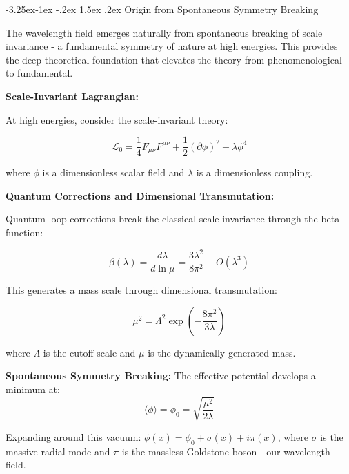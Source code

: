 \documentclass[10pt,twocolumn]{article}
\makeatletter
\renewcommand\subsection{\@startsection{subsection}{2}{\z@}%
  {-3.25ex\@plus -1ex \@minus -.2ex}%
  {1.5ex \@plus .2ex}%
  {\normalfont\normalsize\bfseries}}
\makeatother
\begin{document}
\subsection{Origin from Spontaneous Symmetry Breaking}

The wavelength field emerges naturally from spontaneous breaking of scale invariance - a fundamental symmetry of nature at high energies. This provides the deep theoretical foundation that elevates the theory from phenomenological to fundamental.

\textbf{Scale-Invariant Lagrangian:}

At high energies, consider the scale-invariant theory:

\begin{equation}
\mathcal{L}_0 = \frac{1}{4}F_{\mu\nu}F^{\mu\nu} + \frac{1}{2}(\partial\phi)^2 - \lambda\phi^4
\label{eq:scale_invariant}
\end{equation}

where $\phi$ is a dimensionless scalar field and $\lambda$ is a dimensionless coupling.

\vspace{0.3em}
\textbf{Quantum Corrections and Dimensional Transmutation:}

Quantum loop corrections break the classical scale invariance through the beta function:

\begin{equation}
\beta(\lambda) = \frac{d\lambda}{d\ln\mu} = \frac{3\lambda^2}{8\pi^2} + O(\lambda^3)
\end{equation}

This generates a mass scale through dimensional transmutation:

\begin{equation}
\mu^2 = \Lambda^2 \exp\left(-\frac{8\pi^2}{3\lambda}\right)
\end{equation}

where $\Lambda$ is the cutoff scale and $\mu$ is the dynamically generated mass.

\vspace{0.3em}
\textbf{Spontaneous Symmetry Breaking:}
The effective potential develops a minimum at:
\begin{equation}
\langle\phi\rangle = \phi_0 = \sqrt{\frac{\mu^2}{2\lambda}}
\end{equation}

Expanding around this vacuum: $\phi(x) = \phi_0 + \sigma(x) + i\pi(x)$, where $\sigma$ is the massive radial mode and $\pi$ is the massless Goldstone boson - our wavelength field.
\end{document}
